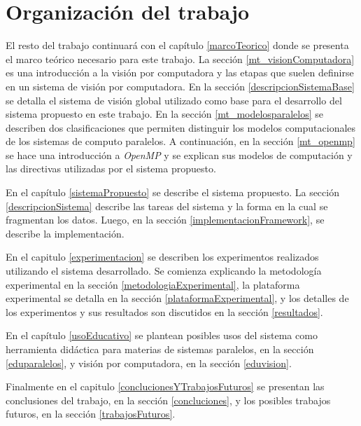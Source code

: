 
\section{Organización del trabajo}

El resto del trabajo continuará con el capítulo \ref{marcoTeorico} donde se
presenta el marco teórico necesario para este trabajo. La sección
\ref{mt_visionComputadora} es una introducción a la visión por computadora y las
etapas que suelen definirse en un sistema de visión por computadora. En la
sección \ref{descripcionSistemaBase} se detalla el sistema de visión global
utilizado como base para el desarrollo del sistema propuesto en este trabajo.
En la sección \ref{mt_modelosparalelos} se describen dos clasificaciones que
permiten distinguir los modelos computacionales de los sistemas de computo
paralelos. A continuación, en la sección \ref{mt_openmp} se hace una
introducción a \emph{OpenMP} y se explican sus modelos de computación y las
directivas utilizadas por el sistema propuesto.

En el capítulo \ref{sistemaPropuesto} se describe el sistema propuesto. La
sección \ref{descripcionSistema} describe las tareas del sistema y la forma en
la cual se fragmentan los datos. Luego, en la sección
\ref{implementacionFramework}, se describe la implementación.

En el capitulo \ref{experimentacion} se describen los experimentos realizados
utilizando el sistema desarrollado. Se comienza explicando la metodología
experimental en la sección \ref{metodologiaExperimental}, la plataforma
experimental se detalla en la sección \ref{plataformaExperimental}, y los
detalles de los experimentos y sus resultados son discutidos en la sección
\ref{resultados}.

En el capítulo \ref{usoEducativo} se plantean posibles usos del sistema como
herramienta didáctica para materias de sistemas paralelos, en la sección
\ref{eduparalelos}, y visión por computadora, en la sección \ref{eduvision}.

Finalmente en el capitulo \ref{conclucionesYTrabajosFuturos} se presentan las
conclusiones del trabajo, en la sección \ref{concluciones}, y los posibles
trabajos futuros, en la sección \ref{trabajosFuturos}.
